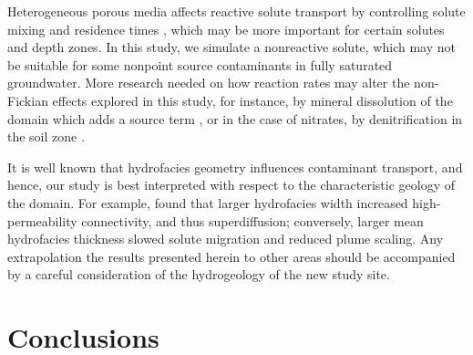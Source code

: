 Heterogeneous porous media affects reactive solute transport by controlling solute mixing and residence times \citep{perez2019organic}, which may be more important for certain solutes and depth zones. In this study, we simulate a nonreactive solute, which may not be suitable for some nonpoint source contaminants in fully saturated groundwater. More research needed on how reaction rates may alter the non-Fickian effects explored in this study, for instance, by mineral dissolution of the domain which adds a source term \citep{schoups2005sustainability}, or in the case of nitrates, by denitrification in the soil zone \citep{lee2006nitrogen}. 

It is well known that hydrofacies geometry influences contaminant transport, and hence, our study is best interpreted with respect to the characteristic geology of the domain. For example, \citet{yin2020super} found that larger hydrofacies width increased high-permeability connectivity, and thus superdiffusion; conversely, larger mean hydrofacies thickness slowed solute migration and reduced plume scaling. Any extrapolation the results presented herein to other areas should be accompanied by a careful consideration of the hydrogeology of the new study site.



\section{Conclusions}
\label{s_5}


